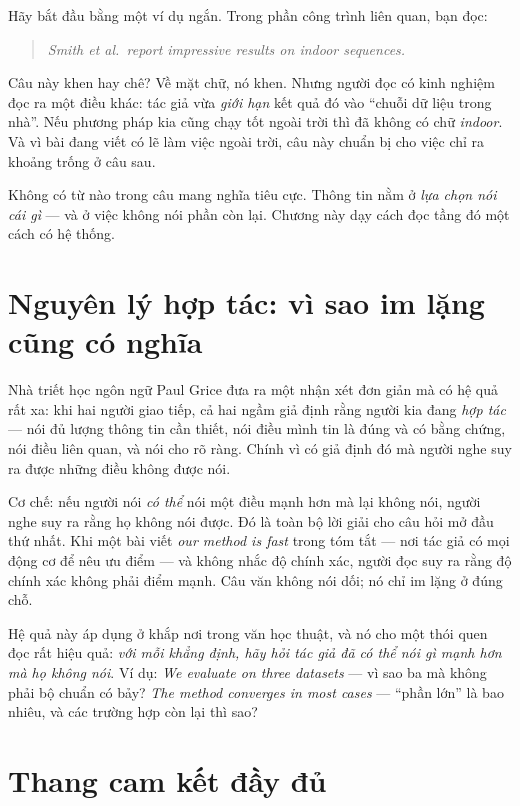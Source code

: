 \documentclass[../../english.tex]{subfiles}
\begin{document}
Hãy bắt đầu bằng một ví dụ ngắn. Trong phần công trình liên quan, bạn đọc:

\begin{quote}
\emph{Smith et al.\ report impressive results on indoor sequences.}
\end{quote}

Câu này khen hay chê? Về mặt chữ, nó khen. Nhưng người đọc có kinh nghiệm đọc ra một điều khác: tác giả vừa \emph{giới hạn} kết quả đó vào ``chuỗi dữ liệu trong nhà''. Nếu phương pháp kia cũng chạy tốt ngoài trời thì đã không có chữ \emph{indoor}. Và vì bài đang viết có lẽ làm việc ngoài trời, câu này chuẩn bị cho việc chỉ ra khoảng trống ở câu sau.

Không có từ nào trong câu mang nghĩa tiêu cực. Thông tin nằm ở \emph{lựa chọn nói cái gì} --- và ở việc không nói phần còn lại. Chương này dạy cách đọc tầng đó một cách có hệ thống.

\section{Nguyên lý hợp tác: vì sao im lặng cũng có nghĩa}

Nhà triết học ngôn ngữ Paul Grice đưa ra một nhận xét đơn giản mà có hệ quả rất xa: khi hai người giao tiếp, cả hai ngầm giả định rằng người kia đang \emph{hợp tác} --- nói đủ lượng thông tin cần thiết, nói điều mình tin là đúng và có bằng chứng, nói điều liên quan, và nói cho rõ ràng\cite{grice1975}. Chính vì có giả định đó mà người nghe suy ra được những điều không được nói.

Cơ chế: nếu người nói \emph{có thể} nói một điều mạnh hơn mà lại không nói, người nghe suy ra rằng họ không nói được. Đó là toàn bộ lời giải cho câu hỏi mở đầu thứ nhất. Khi một bài viết \emph{our method is fast} trong tóm tắt --- nơi tác giả có mọi động cơ để nêu ưu điểm --- và không nhắc độ chính xác, người đọc suy ra rằng độ chính xác không phải điểm mạnh. Câu văn không nói dối; nó chỉ im lặng ở đúng chỗ.

Hệ quả này áp dụng ở khắp nơi trong văn học thuật, và nó cho một thói quen đọc rất hiệu quả: \emph{với mỗi khẳng định, hãy hỏi tác giả đã có thể nói gì mạnh hơn mà họ không nói}. Ví dụ: \emph{We evaluate on three datasets} --- vì sao ba mà không phải bộ chuẩn có bảy? \emph{The method converges in most cases} --- ``phần lớn'' là bao nhiêu, và các trường hợp còn lại thì sao?

\section{Thang cam kết đầy đủ}
\end{document}
